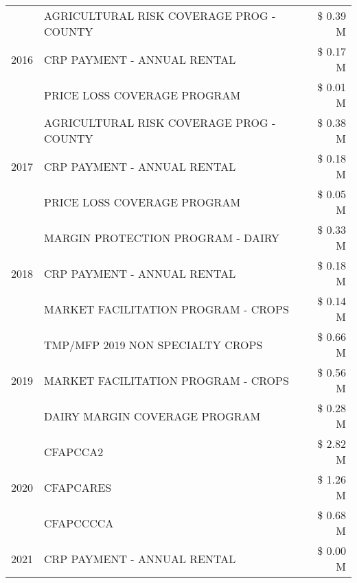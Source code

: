 \begin{tabular}{llr}
\cline{1-3}
\multirow[t]{3}{*}{2016} & AGRICULTURAL RISK COVERAGE PROG - COUNTY & \$ 0.39 M \\
 & CRP PAYMENT - ANNUAL RENTAL & \$ 0.17 M \\
 & PRICE LOSS COVERAGE PROGRAM & \$ 0.01 M \\
\cline{1-3}
\multirow[t]{3}{*}{2017} & AGRICULTURAL RISK COVERAGE PROG - COUNTY & \$ 0.38 M \\
 & CRP PAYMENT - ANNUAL RENTAL & \$ 0.18 M \\
 & PRICE LOSS COVERAGE PROGRAM & \$ 0.05 M \\
\cline{1-3}
\multirow[t]{3}{*}{2018} & MARGIN PROTECTION PROGRAM - DAIRY & \$ 0.33 M \\
 & CRP PAYMENT - ANNUAL RENTAL & \$ 0.18 M \\
 & MARKET FACILITATION PROGRAM - CROPS & \$ 0.14 M \\
\cline{1-3}
\multirow[t]{3}{*}{2019} & TMP/MFP 2019 NON SPECIALTY CROPS & \$ 0.66 M \\
 & MARKET FACILITATION PROGRAM - CROPS & \$ 0.56 M \\
 & DAIRY MARGIN COVERAGE PROGRAM & \$ 0.28 M \\
\cline{1-3}
\multirow[t]{3}{*}{2020} & CFAPCCA2 & \$ 2.82 M \\
 & CFAPCARES & \$ 1.26 M \\
 & CFAPCCCCA & \$ 0.68 M \\
\cline{1-3}
2021 & CRP PAYMENT - ANNUAL RENTAL & \$ 0.00 M \\
\cline{1-3}
\bottomrule
\end{tabular}
